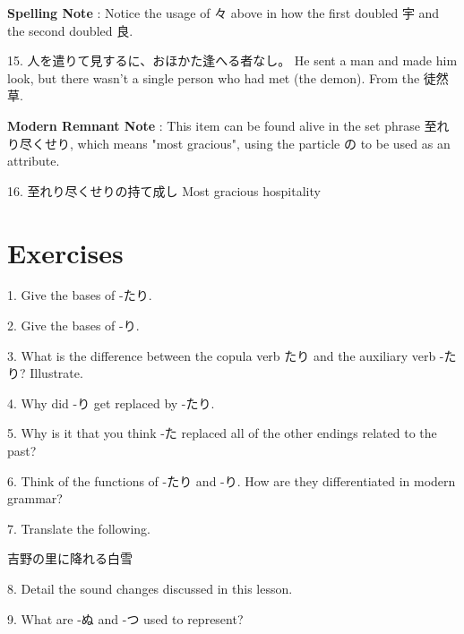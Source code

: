 \par{\textbf{Spelling Note }: Notice the usage of 々 above in how the first doubled 宇 and the second doubled 良. }

\par{15. 人を遣りて見するに、おほかた逢へる者なし。 \hfill\break
He sent a man and made him look, but there wasn't a single person who had met (the demon). \hfill\break
From the 徒然草. }

\par{\textbf{Modern Remnant Note }: This item can be found alive in the set phrase 至れり尽くせり, which means "most gracious", using the particle の to be used as an attribute. }

\par{16. 至れり尽くせりの持て成し \hfill\break
Most gracious hospitality }
      
\section{Exercises}
 
\par{1. Give the bases of -たり. }

\par{2. Give the bases of -り. }

\par{3. What is the difference between the copula verb たり and the auxiliary verb -たり? Illustrate. }

\par{4. Why did -り get replaced by -たり. }

\par{5. Why is it that you think -た replaced all of the other endings related to the past? }

\par{6. Think of the functions of -たり and -り. How are they differentiated in modern grammar? }

\par{7. Translate the following. }

\par{吉野の里に降れる白雪 }

\par{8. Detail the sound changes discussed in this lesson. }

\par{9. What are -ぬ and -つ used to represent? }
    